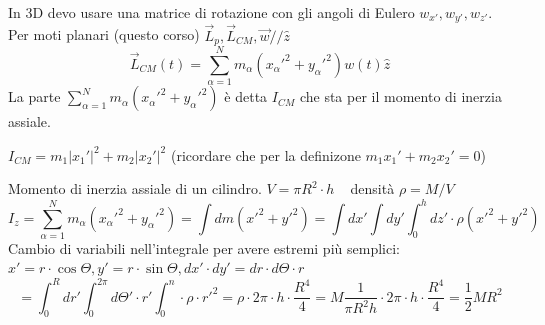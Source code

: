 In 3D devo usare una matrice di rotazione con gli angoli di Eulero $w_{x'}, w_{y'}, w_{z'}$. Per moti planari (questo corso) $\vec{L}_p, \vec{L}_{CM}, \vec{w} // \hat{z}$
$$\vec{L}_{CM}(t) = \sum_{\alpha=1}^{N}m_{\alpha}(x_{\alpha}'^2 + y_{\alpha}'^2)w(t) \hat{z}$$
La parte $\sum_{\alpha=1}^{N}m_{\alpha}(x_{\alpha}'^2 + y_{\alpha}'^2)$ è detta $I_{CM}$ che sta per il momento di inerzia assiale. 
\begin{example}
    $I_{CM} = m_1|x_1'|^2 + m_2|x_2'|^2$ (ricordare che per la definizone $m_1x_1' + m_2x_2' = 0$)
\end{example}
\begin{example}
    Momento di inerzia assiale di un cilindro. $V= \pi R^2\cdot h \hspace{10pt}$ densità $\rho = M/V$
    $$I_z = \sum_{\alpha=1}^{N}m_{\alpha}(x_{\alpha}'^2 + y_{\alpha}'^2) = \int dm(x'^2 + y'^2) = \int dx' \int dy' \int_{0}^{h}dz' \cdot \rho(x'^2 + y'^2)$$
    Cambio di variabili nell'integrale per avere estremi più semplici: $x' = r \cdot \cos\Theta, y' = r \cdot \sin\Theta, dx' \cdot dy' = dr \cdot d\Theta \cdot r$
    $$= \int_{0}^{R}dr' \int_{0}^{2\pi}d\Theta' \cdot r'\int_{0}^{n}\cdot \rho \cdot r'^2 = \rho \cdot 2\pi \cdot h \cdot \frac{R^4}{4} = M\frac{1}{\pi R^2 h} \cdot 2\pi \cdot h \cdot \frac{R^4}{4} = \frac{1}{2}MR^2$$
\end{example}